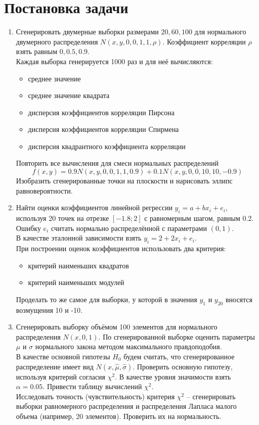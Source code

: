 \documentclass[main.tex]{subfiles}
\begin{document}
  

\section{Постановка задачи}

\begin{enumerate}
	\item Сгенерировать двумерные выборки размерами $20, 60, 100$ для нормального двумерного распределения $N(x,y,0,0,1,1,\rho)$. Коэффициент корреляции $\rho$ взять равным $0, 0.5, 0.9$. \\ 
	Каждая выборка генерируется 1000 раз и для неё вычисляются:
	\begin{itemize}
		\item среднее значение
		\item среднее значение квадрата
		\item дисперсия коэффициентов корреляции Пирсона
		\item дисперсия коэффициентов корреляции Спирмена
		\item дисперсия квадрантного коэффициента корреляции
	\end{itemize}
	Повторить все вычисления для смеси нормальных распределений
	\begin{equation} \label{eq:mix_gauss}
		f(x,y)=0.9 N(x,y,0,0,1,1,0.9) + 0.1N(x,y,0,0,10,10,-0.9)
	\end{equation}
	Изобразить сгенерированные точки на плоскости и нарисовать эллипс равновероятности.
	
	\item Найти оценки коэффициентов линейной регрессии $y_i = a + b x_i + e_i$, используя 20 точек на отрезке $[-1.8; 2]$ с равномерным шагом, равным 0.2. Ошибку $e_i$ считать нормально распределённой с параметрами $(0, 1)$. \\
	В качестве эталонной зависимости взять $y_i = 2 + 2 x_i + e_i$. \\
	При построении оценок коэффициентов использовать два критерия:
	\begin{itemize}
		\item критерий наименьших квадратов
		\item критерий наименьших модулей
	\end{itemize}
	Проделать то же самое для выборки, у которой в значения $y_1 \text{ и } y_{20}$ вносятся возмущения 10 и -10.
	
	\item Сгенерировать выборку объёмом 100 элементов для нормального распределения $N(x,0,1)$. По сгенерированной выборке оценить параметры $\mu \text{ и } \sigma$ нормального закона методом максимального правдоподобия. \\
	В качестве основной гипотезы $H_0$ будем считать, что сгенерированное распределение имеет вид $N(x,\hat{\mu},\hat{\sigma})$. Проверить основную гипотезу, используя критерий согласия $\chi^2$. В качестве уровня значимости взять $\alpha=0.05$. Привести таблицу вычислений $\chi^2$. \\
	Исследовать точность (чувствительность) критерия $\chi^2$ -- сгенерировать выборки равномерного распределения и распределения Лапласа малого объема (например, 20 элементов). Проверить их на нормальность.
	

\end{enumerate}
\end{document}
